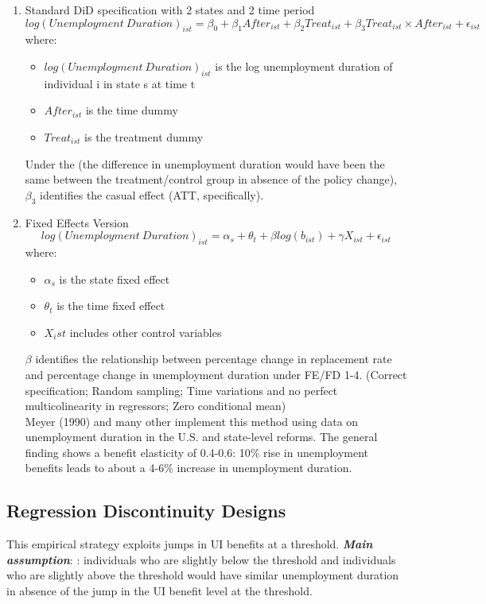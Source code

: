         \begin{enumerate}
            \item Standard DiD specification with 2 states and 2 time period
            $$log(Unemployment\ Duration)_{ist} = \beta_0 + \beta_1 After_{ist} + \beta_2 Treat_{ist} + \beta_3 Treat_{ist} \times After_{ist} + \epsilon_{ist}$$
            where:
            \begin{itemize}
                \item $log(Unemployment\ Duration)_{ist}$ is the log unemployment duration of individual i in state s at time t
                \item $After_{ist}$ is the time dummy
                \item $Treat_{ist}$ is the treatment dummy
            \end{itemize}
            Under the  (the difference in unemployment duration would have been the same between the treatment/control group in absence of the policy change), $\beta_3$ identifies the casual effect (ATT, specifically).
            \item Fixed Effects Version\\
            $$log(Unemployment\ Duration)_{ist} = \alpha_s + \theta_t + \beta log(b_{ist}) + \gamma X_{ist} + \epsilon_{ist}$$
            where:
            \begin{itemize}
                \item $\alpha_s$ is the state fixed effect
                \item $\theta_t$ is the time fixed effect
                \item $X_ist$ includes other control variables
            \end{itemize}
            $\beta$ identifies the relationship between percentage change in replacement rate and percentage change in unemployment duration under FE/FD 1-4. (Correct specification; Random sampling; Time variations and no perfect multicolinearity in regressors; Zero conditional mean)\\
            Meyer (1990) and many other implement this method using data on unemployment duration in the U.S. and state-level reforms. The general finding shows a benefit elasticity of 0.4-0.6: 10\% rise in unemployment benefits leads to about a 4-6\% increase in unemployment duration.
        \end{enumerate}
            
    \subsection{Regression Discontinuity Designs}
        This empirical strategy exploits jumps in UI benefits at a threshold.
        \emph{\textbf{Main assumption}}: : individuals who are slightly below the threshold and individuals who are slightly above the threshold would have similar unemployment duration in absence of the jump in the UI benefit level at the threshold.
        
